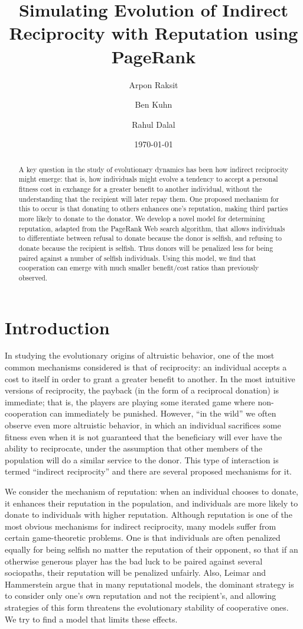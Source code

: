 \documentclass{amsart}
\title[Simulating indirect reciprocity using PageRank]{Simulating
  Evolution of Indirect Reciprocity with Reputation using PageRank}
\author{Arpon Raksit \and Ben Kuhn \and Rahul Dalal}
\date{\today}
\begin{document}
\begin{abstract}
A key question in the study of evolutionary dynamics has been how
indirect reciprocity might emerge: that is, how individuals might
evolve a tendency to accept a personal fitness cost in exchange for a
greater benefit to another individual, without the understanding that
the recipient will later repay them. One proposed mechanism for this
to occur is that donating to others enhances one's reputation, making
third parties more likely to donate to the donator. We develop a novel
model for determining reputation, adapted from the PageRank Web search
algorithm, that allows individuals to differentiate between refusal to
donate because the donor is selfish, and refusing to donate because
the recipient is selfish. Thus donors will be penalized less for being
paired against a number of selfish individuals. Using this model, we
find that cooperation can emerge with much smaller benefit/cost ratios
than previously observed.
\end{abstract}

\maketitle

\section{Introduction}

In studying the evolutionary origins of altruistic behavior, one of
the most common mechanisms considered is that of reciprocity: an
individual accepts a cost to itself in order to grant a greater
benefit to another. In the most intuitive versions of reciprocity, the
payback (in the form of a reciprocal donation) is immediate; that is,
the players are playing some iterated game where non-cooperation can
immediately be punished. However, ``in the wild'' we often observe
even more altruistic behavior, in which an individual sacrifices some
fitness even when it is not guaranteed that the beneficiary will ever
have the ability to reciprocate, under the assumption that other
members of the population will do a similar service to the donor. This
type of interaction is termed ``indirect reciprocity'' and there are
several proposed mechanisms for it.

We consider the mechanism of reputation: when an individual chooses to
donate, it enhances their reputation in the population, and
individuals are more likely to donate to individuals with higher
reputation. Although reputation is one of the most obvious mechanisms
for indirect reciprocity, many models suffer from certain
game-theoretic problems. One is that individuals are often penalized
equally for being selfish no matter the reputation of their opponent,
so that if an otherwise generous player has the bad luck to be paired
against several sociopaths, their reputation will be penalized
unfairly. Also, Leimar and Hammerstein \cite{leimar_evolution_2001}
argue that in many reputational models, the dominant strategy is to
consider only one's own reputation and not the recipient's, and
allowing strategies of this form threatens the evolutionary stability
of cooperative ones. We try to find a model that limits these effects.
\end{document}

